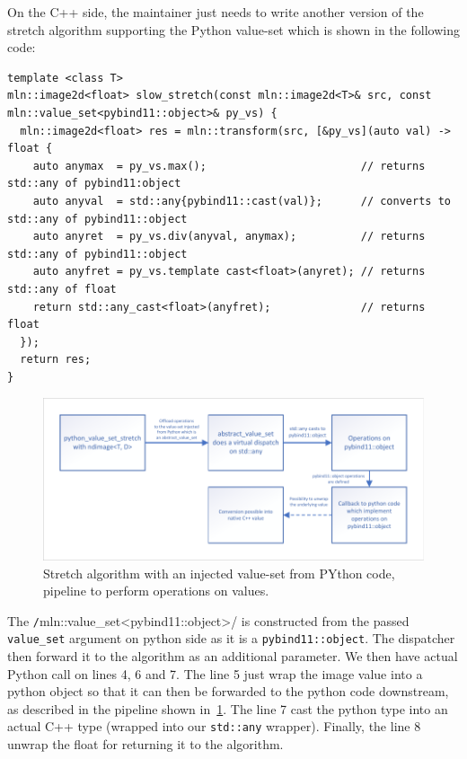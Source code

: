 On the C++ side, the maintainer just needs to write another version of the stretch algorithm supporting the Python
value-set which is shown in the following code:
\begin{verbatim}
template <class T>
mln::image2d<float> slow_stretch(const mln::image2d<T>& src, const mln::value_set<pybind11::object>& py_vs) {
  mln::image2d<float> res = mln::transform(src, [&py_vs](auto val) -> float {
    auto anymax  = py_vs.max();                        // returns std::any of pybind11:object
    auto anyval  = std::any{pybind11::cast(val)};      // converts to std::any of pybind11::object
    auto anyret  = py_vs.div(anyval, anymax);          // returns std::any of pybind11::object
    auto anyfret = py_vs.template cast<float>(anyret); // returns std::any of float
    return std::any_cast<float>(anyfret);              // returns float
  });
  return res;
}
\end{verbatim}

\begin{figure}[htbp]
  \centering
  \includegraphics[width=.8\linewidth]{figs/static_dynamic_bridge/python_injected_value_set_stretch}
  \caption{Stretch algorithm with an injected value-set from PYthon code, pipeline to perform operations on values.}
  \label{fig:static_dyn.python_injected_value_set_stretch}
\end{figure}

The \texttt/mln::value_set<pybind11::object>/ is constructed from the passed \texttt{value\_set} argument on
python side as it is a \texttt{pybind11::object}. The dispatcher then forward it to the algorithm as an additional
parameter. We then have actual Python call on lines 4, 6 and 7. The line 5 just wrap the image value into a python
object so that it can then be forwarded to the python code downstream, as described in the pipeline shown
in~\cref{fig:static_dyn.python_injected_value_set_stretch}. The line 7 cast the python type into an actual C++ type
(wrapped into our \texttt{std::any} wrapper). Finally, the line 8 unwrap the float for returning it to the algorithm.


